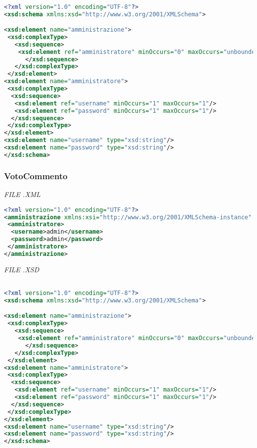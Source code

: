 \documentclass [a4paper,11pt]{book}
\begin{document}
\begin{lstlisting}[language=XML]

<?xml version="1.0" encoding="UTF-8"?>
<xsd:schema xmlns:xsd="http://www.w3.org/2001/XMLSchema">

<xsd:element name="amministrazione">
 <xsd:complexType>
   <xsd:sequence>
    <xsd:element ref="amministratore" minOccurs="0" maxOccurs="unbounded" />
      </xsd:sequence>
   </xsd:complexType>
 </xsd:element>
<xsd:element name="amministratore">
 <xsd:complexType>
  <xsd:sequence>
   <xsd:element ref="username" minOccurs="1" maxOccurs="1"/>
   <xsd:element ref="password" minOccurs="1" maxOccurs="1"/>
  </xsd:sequence>
 </xsd:complexType>
</xsd:element>
<xsd:element name="username" type="xsd:string"/>
<xsd:element name="password" type="xsd:string"/>
</xsd:schema>
\end{lstlisting}

\medskip

\subsubsection{VotoCommento}

\emph{FILE .XML}

\begin{lstlisting}[language=XML]
<?xml version="1.0" encoding="UTF-8"?>
<amministrazione xmlns:xsi="http://www.w3.org/2001/XMLSchema-instance" xsi:noNamespaceSchemaLocation="amministrazione.xsd">
 <amministratore>
  <username>admin</username>
  <password>admin</password>
 </amministratore>
</amministrazione>
\end{lstlisting}

\emph{FILE .XSD}

\begin{lstlisting}[language=XML]

<?xml version="1.0" encoding="UTF-8"?>
<xsd:schema xmlns:xsd="http://www.w3.org/2001/XMLSchema">

<xsd:element name="amministrazione">
 <xsd:complexType>
   <xsd:sequence>
    <xsd:element ref="amministratore" minOccurs="0" maxOccurs="unbounded" />
      </xsd:sequence>
   </xsd:complexType>
 </xsd:element>
<xsd:element name="amministratore">
 <xsd:complexType>
  <xsd:sequence>
   <xsd:element ref="username" minOccurs="1" maxOccurs="1"/>
   <xsd:element ref="password" minOccurs="1" maxOccurs="1"/>
  </xsd:sequence>
 </xsd:complexType>
</xsd:element>
<xsd:element name="username" type="xsd:string"/>
<xsd:element name="password" type="xsd:string"/>
</xsd:schema>
\end{lstlisting}
\end{document}
